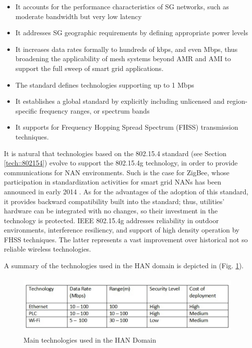 \documentclass[11pt,draftclsnofoot,onecolumn]{IEEEtran}
\begin{document}
\begin{itemize}
	\item It accounts for the performance characteristics of SG networks, such as moderate bandwidth but very low latency
	\item It addresses SG geographic requirements by defining appropriate power levels
	\item It increases data rates formally to hundreds of kbps, and even Mbps, thus broadening the applicability of mesh systems beyond AMR and AMI to support the full sweep of smart grid applications. 
	\item The standard defines technologies supporting up to 1 Mbps
	\item It establishes a global standard by explicitly including unlicensed and region-specific frequency ranges, or spectrum bands
	\item It supports for Frequency Hopping Spread Spectrum (FHSS) transmission techniques.
\end{itemize}

It is natural that technologies based on the 802.15.4 standard (see Section \ref{tech::802154}) evolve to support the 802.15.4g technology, in order to provide communications for NAN environments. Such is the case for ZigBee, whose participation in standardization activities for smart grid NANs has been announced in early 2014 \cite{ZigBeeNAN}. As for the advantages of the adoption of this standard, it provides backward compatibility built into the standard; thus, utilities' hardware can be integrated with no changes, so their investment in the technology is protected. IEEE 802.15.4g addresses reliability in outdoor environments, interference resiliency, and support of high density operation by FHSS techniques. The latter represents a vast improvement over historical not so reliable wireless technologies.

A summary of the technologies used in the HAN domain is depicted in  (Fig. \ref{fig:han}).

\begin{figure}[h!]
\centering
\includegraphics [height=3cm] {HANTechnologies}
\caption{Main technologies used in the HAN Domain}
\label{fig:han}
\end{figure}
\end{document}
